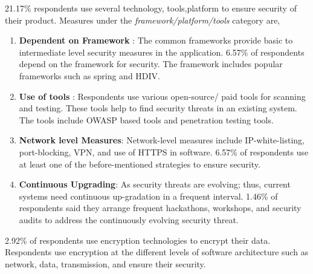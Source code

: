 21.17\% respondents use several technology, tools,platform to ensure security of their product. Measures under the \emph{framework/platform/tools} category are,
\begin{enumerate}[label=(\alph*)]

     \item \textbf{Dependent on Framework} : The common frameworks provide basic to intermediate level security measures in the application. 6.57\% of respondents depend on the framework for security. The framework includes popular frameworks such as spring and  HDIV.
    
    \item \textbf{Use of tools} : Respondents use various open-source/ paid tools for scanning and testing. These tools help to find security threats in an existing system. The tools include OWASP based tools and  penetration testing tools.
    
    \item \textbf{Network level Measures}: Network-level measures include IP-white-listing, port-blocking, VPN, and use of HTTPS  in software. 6.57\% of respondents use at least one of the before-mentioned strategies to ensure security.

    \item \textbf{Continuous Upgrading}: As security threats are evolving; thus, current systems need continuous up-gradation in a frequent interval. 1.46\% of respondents said they arrange frequent hackathons, workshops, and security audits to address the continuously evolving security threat.

\end{enumerate}

2.92\% of respondents use encryption technologies to encrypt their data. Respondents use encryption at the different levels of software architecture such as network, data, transmission, and ensure their security.


